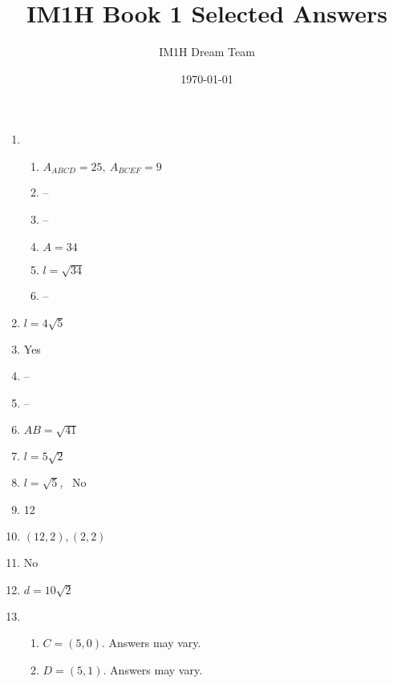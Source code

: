 \documentclass{article}
\title{IM1H Book 1 Selected Answers}
\author{IM1H Dream Team}
\date{\today}
\begin{document}
\maketitle

\begin{enumerate}

\item

	\begin{enumerate}
	
 	\item $A_{ABCD} = 25, \ A_{BCEF} = 9$
	
	\item --
	
	\item --
	
	\item $A = 34$
	
	\item $l = \sqrt{34}$
	
	\item --
	
	\end{enumerate}
	
\item $l = 4\sqrt{5}$

\item Yes

\item --

\item --

\item $AB = \sqrt{41}$

\item $l = 5\sqrt{2}$

\item $l = \sqrt{5}$, \ No

\item 12

\item $(12, 2), (2, 2)$

\item No

\item $d = 10\sqrt{2}$

\item

	\begin{enumerate}
	
	\item $C = (5, 0).$ Answers may vary.
	
	\item $D = (5, 1).$ Answers may vary.
	

\end{enumerate}
\end{enumerate}
\end{document}
